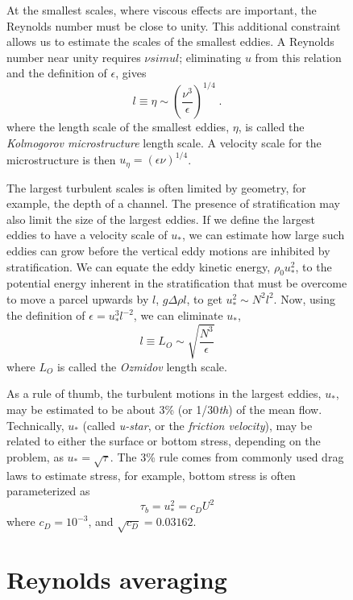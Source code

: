 \documentclass[11pt]{report}
\numberwithin{equation}{section}
\begin{document}
\begin{figure}
At the smallest scales, where viscous effects are important, the Reynolds number must be close to unity.  This additional constraint allows us to estimate the scales of the smallest eddies.  A Reynolds number near unity requires $\nu sim u l$; eliminating $u$ from this relation and the definition of $\epsilon$, gives
\begin{equation}
    l \equiv \eta \sim \left( \frac{\nu^3}{\epsilon} \right)^{1/4} \; .
\end{equation}
where the length scale of the smallest eddies, $\eta$, is called the \emph{Kolmogorov microstructure} length scale.  A velocity scale for the microstructure is then $u_{\eta} = (\epsilon \nu)^{1/4}$.

The largest turbulent scales is often limited by geometry, for example, the depth of a channel.  The presence of stratification may also limit the size of the largest eddies.  If we define the largest eddies to have a velocity scale of $u_*$, we can estimate how large such eddies can grow before the vertical eddy motions are inhibited by stratification.  We can equate the eddy kinetic energy, $\rho_0 u_*^2$, to the potential energy inherent in the stratification that must be overcome to move a parcel upwards by $l$, $g \Delta\rho l$, to get $u_*^2 \sim N^2 l^2$.  Now, using the definition of $\epsilon = u_*^3 l^{-2}$, we can eliminate $u_*$,
\begin{equation}
    l \equiv L_O \sim \sqrt{\frac{N^3}{\epsilon}}
\end{equation}
where $L_O$ is called the \emph{Ozmidov} length scale.

As a rule of thumb, the turbulent motions in the largest eddies, $u_*$, may be estimated to be about 3\% (or 1/30\emph{th}) of the mean flow.  Technically, $u_*$ (called \emph{u-star}, or the \emph{friction velocity}), may be related to either the surface or bottom stress, depending on the problem, as $u_* = \sqrt{\tau}$.  The 3\% rule comes from commonly used drag laws to estimate stress, for example, bottom stress is often parameterized as
\begin{equation}
    \tau_b = u_*^2 = c_D U^2
\end{equation}
where $c_D = 10^{-3}$, and $\sqrt{c_D} = 0.03162$.

\section{Reynolds averaging}


\end{figure}
\end{document}

